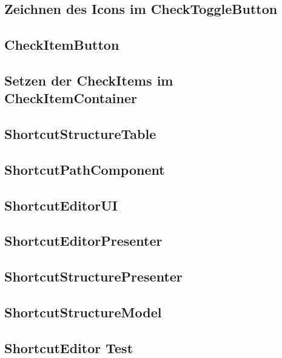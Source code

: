 \subsection{Zeichnen des Icons im CheckToggleButton}\label{CheckToggleButton}


\subsection{CheckItemButton}\label{CheckItemButton}

\vspace{300px}
\newpage

\subsection{Setzen der CheckItems im CheckItemContainer}\label{CheckItemContainer}


\subsection{ShortcutStructureTable}\label{ShortcutStructureTable}


\subsection{ShortcutPathComponent}\label{ShortcutPathComponent}


\clearpage
\setcounter{page}{23}
\subsection{ShortcutEditorUI}\label{ShortcutEditorUI}


\clearpage
\setcounter{page}{24}
\subsection{ShortcutEditorPresenter}\label{ShortcutEditorPresenter}


\clearpage
\setcounter{page}{25}
\subsection{ShortcutStructurePresenter}\label{ShortcutStructurePresenter}



\clearpage
\setcounter{page}{27}
\subsection{ShortcutStructureModel}\label{ShortcutStructureModel}


\clearpage
\setcounter{page}{28}
\subsection{ShortcutEditor Test}\label{Test_ShortcutEditor}

